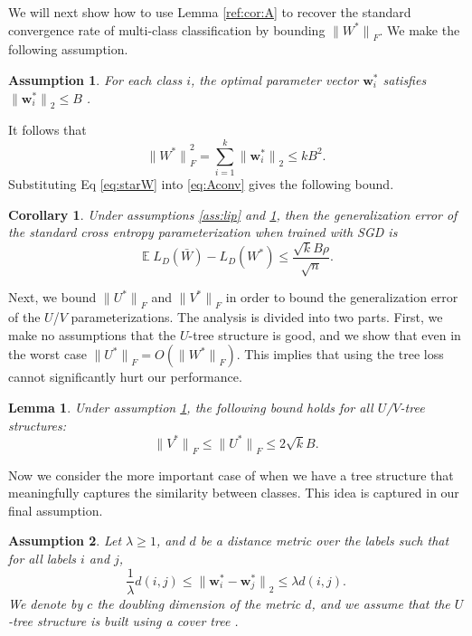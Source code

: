 \documentclass[twoside]{article}
\newtheorem{assumption}{Assumption}
\newtheorem{lemma}{Lemma}
\newtheorem{corollary}{Corollary}
\DeclareMathOperator{\E}{\mathbb E}
\renewcommand{\star}[1]{{#1}^{*}}
\newcommand{\w}{\mathbf w}
\newcommand{\ltwo}[1]{{\lVert {#1} \rVert}_2}
\newcommand{\lF}[1]{{\lVert {#1} \rVert}_F}
\begin{document}

We will next show how to use Lemma \ref{ref:cor:A} to recover the standard convergence rate of multi-class classification by bounding $\lF{\star W}$.
We make the following assumption.
\begin{assumption}
    \label{ass:B}
    For each class $i$, the optimal parameter vector $\star\w_i$ satisfies
        $\ltwo{\star\w_i} \le B$
        .
\end{assumption}
It follows that
\begin{equation}
    \lF{\star W}^2 = \sum_{i=1}^k \ltwo{\star\w_i} \le kB^2.
    \label{eq:starW}
\end{equation}
Substituting Eq \eqref{eq:starW} into \eqref{eq:Aconv} gives the following bound.
\begin{corollary}
\label{theorem:xentropy}
    Under assumptions \ref{ass:lip} and \ref{ass:B},
    then the generalization error of the standard cross entropy parameterization when trained with SGD is
\begin{equation}
    \E L_D(\bar W) - L_D(W^*)
    \le \frac {\sqrt kB\rho}{\sqrt n}
    .
\end{equation}
\end{corollary}

Next, we bound $\lF{\star U}$ and $\lF{\star V}$ in order to bound the generalization error of the $U$/$V$ parameterizations.
The analysis is divided into two parts.
First, we make no assumptions that the $U$-tree structure is good,
and we show that even in the worst case $\lF{\star U} = O(\lF{\star W})$.
This implies that using the tree loss cannot significantly hurt our performance.
\begin{lemma}
    \label{lemma:starU}
    Under assumption \ref{ass:B},
    the following bound holds for all $U$/$V$-tree structures:
    \begin{equation}
        \lF{\star V} \le \lF{\star U} \le 2\sqrt{k}B.
    \end{equation}
\end{lemma}
Now we consider the more important case of when we have a tree structure that meaningfully captures the similarity between classes.
This idea is captured in our final assumption.
\begin{assumption}
    \label{ass:metric}
    Let $\lambda \ge 1$, and $d$ be a distance metric over the labels such that for all labels $i$ and $j$,
\begin{equation}
    \frac 1 \lambda d(i,j)
    \le \ltwo{\star \w_i - \star \w_j}
    \le \lambda d(i, j).
\end{equation}
We denote by $c$ the doubling dimension of the metric $d$,
and we assume that the $U$-tree structure is built using a cover tree \citep{beygelzimer2006cover}.
\end{assumption}
\end{document}
